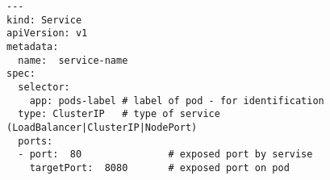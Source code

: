 \begin{lstfloat}
\begin{lstlisting}[style=mybashstyle,
caption={Ukázka definice objektu Service},
label={sample:service}
]
---
kind: Service
apiVersion: v1
metadata:
  name:  service-name
spec:
  selector:
    app: pods-label # label of pod - for identification 
  type: ClusterIP   # type of service (LoadBalancer|ClusterIP|NodePort)
  ports:
  - port:  80               # exposed port by servise
    targetPort:  8080       # exposed port on pod
\end{lstlisting}
\end{lstfloat}